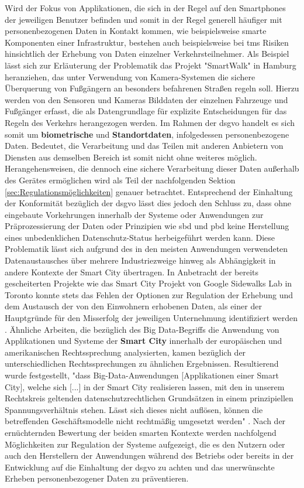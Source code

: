 Wird der Fokus von Applikationen, die sich in der Regel auf den Smartphones der jeweiligen Benutzer befinden und somit in der Regel generell häufiger mit personenbezogenen Daten in Kontakt kommen, wie beispielsweise smarte Komponenten einer Infrastruktur, bestehen auch beispielsweise bei \ac{tms} Risiken hinsichtlich der Erhebung von Daten einzelner Verkehrsteilnehmer.
Als Beispiel lässt sich zur Erläuterung der Problematik das Projekt "SmartWalk" \cite{SmartWalk2022} in Hamburg heranziehen, das unter Verwendung von Kamera-Systemen die sichere Überquerung von Fußgängern an besonders befahrenen Straßen regeln soll. 
Hierzu werden von den Sensoren und Kameras Bilddaten der einzelnen Fahrzeuge und Fußgänger erfasst, die als Datengrundlage für explizite Entscheidungen für das Regeln des Verkehrs herangezogen werden. Im Rahmen der \ac{dsgvo} handelt es sich somit um \textbf{biometrische} und \textbf{Standortdaten}, infolgedessen personenbezogene Daten. 
Bedeutet, die Verarbeitung und das Teilen mit anderen Anbietern von Diensten aus demselben Bereich ist somit nicht ohne weiteres möglich. Herangehensweisen, die dennoch eine sichere Verarbeitung dieser Daten außerhalb des Gerätes ermöglichen wird als Teil der nachfolgenden Sektion \ref{sec:Regulationsmöglichkeiten} genauer betrachtet. 
Entsprechend der Einhaltung der Konformität bezüglich der \ac{dsgvo} lässt dies jedoch den Schluss zu, dass ohne eingebaute Vorkehrungen innerhalb der Systeme oder Anwendungen zur Präprozessierung der Daten oder Prinzipien wie \ac{sbd} und \ac{pbd} keine Herstellung eines unbedenklichen Datenschutz-Status herbeigeführt werden kann. 
Diese Problematik lässt sich aufgrund des in den meisten Anwendungen verwendeten Datenaustausches über mehrere Industriezweige hinweg \cite{BCG2020} als Abhängigkeit in andere Kontexte der Smart City übertragen.
In Anbetracht der bereits gescheiterten Projekte wie das Smart City Projekt von Google Sidewalks Lab in Toronto \cite{SidewalkToronto2022} konnte stets das Fehlen der Optionen zur Regulation der Erhebung und dem Austausch der von den Einwohnern erhobenen Daten, als einer der Hauptgründe für den Misserfolg der jeweiligen Unternehmung identifiziert werden \cite{Bernier2022}.
Ähnliche Arbeiten, die bezüglich des Big Data-Begriffs die Anwendung von Applikationen und Systeme der \textbf{Smart City} innerhalb der europäischen und amerikanischen Rechtssprechung analysierten, kamen bezüglich der unterschiedlichen Rechtssprechungen zu ähnlichen Ergebnissen.
Resultierend wurde festgestellt, "dass Big-Data-Anwendungen [Applikationen einer Smart City], welche sich [...] in der Smart City realisieren lassen, mit den in unserem Rechtskreis geltenden datenschutzrechtlichen Grundsätzen in einem prinzipiellen Spannungsverhältnis stehen. Lässt sich dieses nicht auflösen, können die betreffenden Geschäftsmodelle nicht rechtmäßig umgesetzt werden" \cite[p.~45]{Sennhauser2019}. 
Nach der ernüchternden Bewertung der beiden smarten Kontexte werden nachfolgend Möglichkeiten zur Regulation der Systeme aufgezeigt, die es den Nutzern oder auch den Herstellern der Anwendungen während des Betriebs oder bereits in der Entwicklung auf die Einhaltung der \ac{dsgvo} zu achten und das unerwünschte Erheben personenbezogener Daten zu präventieren.
